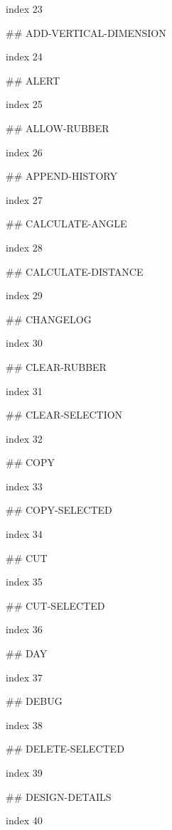 index 23



## ADD-VERTICAL-DIMENSION

index 24



## ALERT

index 25



## ALLOW-RUBBER

index 26



## APPEND-HISTORY

index 27



## CALCULATE-ANGLE

index 28



## CALCULATE-DISTANCE

index 29



## CHANGELOG

index 30



## CLEAR-RUBBER

index 31



## CLEAR-SELECTION

index 32



## COPY

index 33



## COPY-SELECTED

index 34



## CUT

index 35



## CUT-SELECTED

index 36



## DAY

index 37



## DEBUG

index 38



## DELETE-SELECTED

index 39



## DESIGN-DETAILS

index 40



